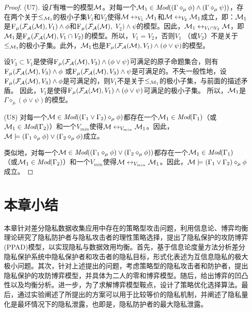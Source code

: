 \begin{proof}
	
	(U7). 设$\Gamma$有唯一的模型${\cal M}$。对每一个${\cal M}_1 \in \textit{Mod}((\Gamma \diamond_{\mu} \phi) \wedge (\Gamma \diamond_{\mu} \psi))$，存在两个关于$\leq_{{\cal M}_1}$的极小子集$V_1$和$V_2$使得${\cal M} \leftrightarrow_{V_1} {\cal M}_1$和${\cal M} \leftrightarrow_{V_2} {\cal M}_1$成立，即：${\cal M}_1$是${\textsc{F}_{\textsc{$\mu$}}}({\cal F}_{{\cal A}}({\cal M}), V_1) \wedge \phi$和${\textsc{F}_{\textsc{$\mu$}}}({\cal F}_{{\cal A}}({\cal M}),$ $V_2) \wedge \psi$的模型。因此，${\cal M}_1 \leftrightarrow_{V_1 \cap V_2} {\cal M}$，即${\cal M}_1$是${\textsc{F}_{\textsc{$\mu$}}}({\cal F}_{{\cal A}}({\cal M}), V_1 \cap V_2)$的模型。所以，$V_1 = V_2$，否则$V_1$ （或$V_2$）不是关于$\leq_{{\cal M}_1}$的极小子集。此外，${\cal M}_1$也是${\textsc{F}_{\textsc{$\mu$}}}({\cal F}_{{\cal A}}({\cal M}), V_1) \wedge (\phi \vee \psi)$的模型。
	
	设$V_3\subset V_1$是使得${\textsc{F}_{\textsc{$\mu$}}}({\cal F}_{{\cal A}}({\cal M}), V_3) \wedge (\phi \vee \psi)$可满足的原子命题集合，则有${\textsc{F}_{\textsc{$\mu$}}}({\cal F}_{{\cal A}}({\cal M}), V_3) \wedge \phi$ 或${\textsc{F}_{\textsc{$\mu$}}}({\cal F}_{{\cal A}}({\cal M}), V_3) \wedge \psi$是可满足的。不失一般性地，设${\textsc{F}_{\textsc{$\mu$}}}({\cal F}_{{\cal A}}({\cal M}), V_3) \wedge \phi$是可满足的，则$V_1$不是关于$\leq_{{\cal M}_1}$的极小子集，与前面的描述矛盾。
	因此，$V_1$是使得${\textsc{F}_{\textsc{$\mu$}}}({\cal F}_{{\cal A}}({\cal M}), V_1) \wedge (\phi \vee \psi)$可满足的极小子集。
	所以，${\cal M}_1$是$\Gamma \diamond_{\mu} (\phi \vee \psi)$的模型。
	
	(U8) 对每一个${\cal M} \in \textit{Mod}((\Gamma_1 \vee \Gamma_2) \diamond_{\mu} \phi)$都存在一个${\cal M}_1 \in \textit{Mod}(\Gamma_1)$（或${\cal M}_1\in \textit{Mod}(\Gamma_2)$）和一个$V_{min}$使得${\cal M} \leftrightarrow_{V_{min}} {\cal M}_1$。因此，${\cal M} \models  (\Gamma_1 \diamond_{\mu} \phi) \vee (\Gamma_2 \diamond_{\mu} \phi)$成立。
	
	类似地，对每一个${\cal M} \in \textit{Mod}( (\Gamma_1 \diamond_{\mu} \phi) \vee (\Gamma_2 \diamond_{\mu} \phi))$都存在一个${\cal M}_1\in \textit{Mod}(\Gamma_1)$ （或${\cal M}_1 \in \textit{Mod}(\Gamma_2)$）和一个$V_{min}$使得${\cal M} \leftrightarrow_{V_{min}} {\cal M}_1$。因此，${\cal M} \models (\Gamma_1 \vee \Gamma_2) \diamond_{\mu} \phi$成立。
\end{proof}

\section{本章小结}\label{sec:chapter07-conclusion}

本章针对差分隐私数据收集应用中存在的策略型攻击问题，利用信息论、博弈均衡理论研究了隐私防护者与隐私攻击者的理性策略选择，提出了隐私保护的攻防博弈(PPAD)模型，以实现隐私与数据效用均衡。首先，基于信息论度量方法分析差分隐私保护系统中隐私保护者和攻击者的隐私目标，形式化表述为互信息隐私的极大极小问题。其次，针对上述提出的问题，考虑策略型的隐私攻击者和防护者，提出隐私保护的攻防博弈模型，并具体为二人的零和博弈模型。随后，给出博弈的凹凸性以及均衡分析。进一步，为了求解博弈模型鞍点，设计了策略优化选择算法。最后，通过实验阐述了所提出的方案可以用于比较等价的隐私机制，并阐述了隐私量化是最坏情况下的隐私泄露，也即是，隐私防护者的最大隐私泄露。
